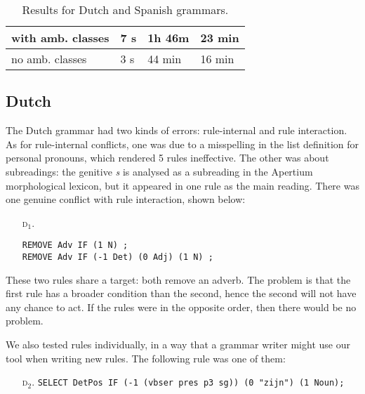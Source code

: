 {{\begin{table}[h]
\begin{tabular}{|p{2.84cm}|p{1cm}|p{1.15cm}|p{1.55cm}|}
\clock{} with amb. 
           classes & 7 s        & 1h 46m   &  23 min  \\ \hline

\clock{} no amb. 
           classes & 3 s        & 44 min       & 16 min     \\ \hline 


\end{tabular}
\caption{Results for Dutch and Spanish grammars.}
\label{table:res}
\end{table}

\subsection{Dutch} The Dutch grammar had two kinds of errors: rule-internal and rule interaction. As for rule-internal conflicts, one was due to a misspelling in the list definition for personal pronouns, which rendered 5 rules ineffective. The other was about subreadings: the genitive \emph{s} is analysed as a subreading in the Apertium morphological lexicon, but it appeared in one rule as the main reading. 
There was one genuine conflict with rule interaction, shown below:

\begin{itemize}
\item[\textsc{d$_1$.}] 
\begin{verbatim}REMOVE Adv IF (1 N) ;
REMOVE Adv IF (-1 Det) (0 Adj) (1 N) ;\end{verbatim}
\end{itemize}

\noindent These two rules share a target: both remove an adverb.
The problem is that the first rule has a broader condition than the second, hence the second will not have any chance to act. 
If the rules were in the opposite order, then there would be no problem.



We also tested rules individually, in a way that a grammar writer might use our tool when writing new rules.
The following rule was one of them:

\begin{itemize}
\item[\textsc{d$_2$.}] 
\texttt{SELECT DetPos IF (-1 (vbser pres p3 sg)) (0 "zijn") (1 Noun);}
\end{itemize} 

}}
